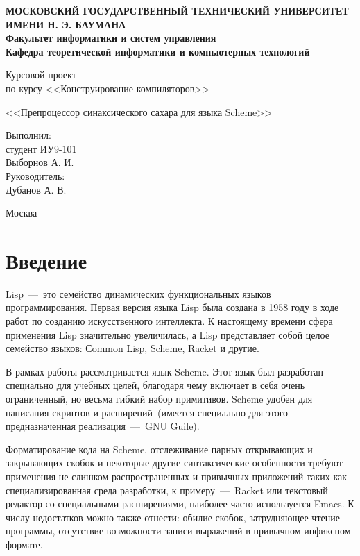 \documentclass[12pt,a4paper,oneside]{extarticle}
\begin{document}
\pgfplotsset{compat=1.8}

\thispagestyle{empty}
\newpage
{
\centering


\textbf{
МОСКОВСКИЙ ГОСУДАРСТВЕННЫЙ ТЕХНИЧЕСКИЙ УНИВЕРСИТЕТ ИМЕНИ Н. Э. БАУМАНА \\
Факультет информатики и систем управления \\
Кафедра теоретической информатики и компьютерных технологий}
\bigskip
\bigskip
\bigskip
\bigskip
\bigskip
\bigskip
\bigskip

\vfill

Курсовой проект \\
по курсу <<Конструирование компиляторов>>

\bigskip

{\large <<Препроцессор синаксического сахара для языка Scheme>>}
\bigskip

\vfill



\hfill\parbox{4cm} {
Выполнил:\\
студент ИУ9-101 \hfill \\
Выборнов А. И.\hfill \medskip\\
Руководитель:\\
Дубанов А. В.\hfill
}


\vspace{\fill}

Москва \number\year
\clearpage
}


\tableofcontents

\clearpage

\section*{Введение}
    Lisp~---~это семейство динамических функциональных языков программирования.
    Первая версия языка Lisp была создана в 1958 году в ходе работ по созданию искусственного интеллекта.
    К настоящему времени сфера применения Lisp значительно увеличилась, а Lisp представляет собой целое семейство языков: Сommon Lisp, Scheme, Racket и другие. 

    В рамках работы рассматривается язык Scheme.
    Этот язык был разработан специально для учебных целей, благодаря чему включает в себя очень ограниченный, но весьма гибкий набор примитивов.
    Scheme удобен для написания скриптов и расширений~(имеется специально для этого предназначенная реализация~---~GNU Guile).

    Форматирование кода на Scheme, отслеживание парных открывающих и закрывающих скобок и некоторые другие синтаксические особенности требуют применения не слишком распространенных и привычных приложений таких как специализированная среда разработки, к примеру~---~Racket или текстовый редактор со специальными расширениями, наиболее часто используется Emacs. 
    К числу недостатков можно также отнести: обилие скобок, затрудняющее чтение программы, отсутствие возможности записи выражений в привычном инфиксном формате.
\end{document}
